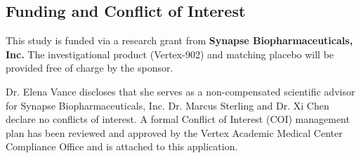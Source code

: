 \subsection{Funding and Conflict of Interest}
This study is funded via a research grant from \textbf{Synapse Biopharmaceuticals, Inc.} The investigational product (Vertex-902) and matching placebo will be provided free of charge by the sponsor. 

Dr. Elena Vance discloses that she serves as a non-compensated scientific advisor for Synapse Biopharmaceuticals, Inc. Dr. Marcus Sterling and Dr. Xi Chen declare no conflicts of interest. A formal Conflict of Interest (COI) management plan has been reviewed and approved by the Vertex Academic Medical Center Compliance Office and is attached to this application.
